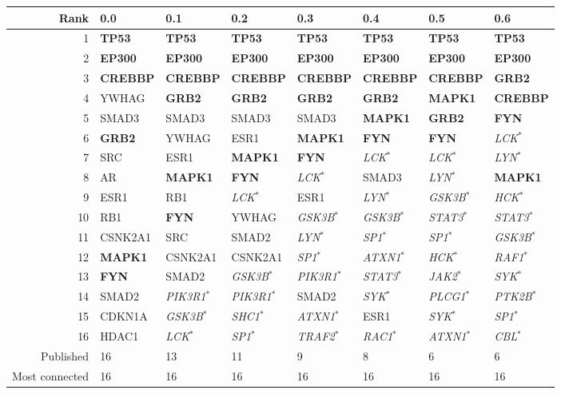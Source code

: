 \begin{tabular}{r*{7}{l}}
\toprule
Rank & 0.0 & 0.1 & 0.2 & 0.3 & 0.4 & 0.5 & 0.6 \\
\midrule
1 & \textbf{TP53} & \textbf{TP53} & \textbf{TP53} & \textbf{TP53} & \textbf{TP53} & \textbf{TP53} & \textbf{TP53} \\
2 & \textbf{EP300} & \textbf{EP300} & \textbf{EP300} & \textbf{EP300} & \textbf{EP300} & \textbf{EP300} & \textbf{EP300} \\
3 & \textbf{CREBBP} & \textbf{CREBBP} & \textbf{CREBBP} & \textbf{CREBBP} & \textbf{CREBBP} & \textbf{CREBBP} & \textbf{GRB2} \\
4 & YWHAG & \textbf{GRB2} & \textbf{GRB2} & \textbf{GRB2} & \textbf{GRB2} & \textbf{MAPK1} & \textbf{CREBBP} \\
5 & SMAD3 & SMAD3 & SMAD3 & SMAD3 & \textbf{MAPK1} & \textbf{GRB2} & \textbf{FYN} \\
6 & \textbf{GRB2} & YWHAG & ESR1 & \textbf{MAPK1} & \textbf{FYN} & \textbf{FYN} & \textit{LCK}$^{\ast}$ \\
7 & SRC & ESR1 & \textbf{MAPK1} & \textbf{FYN} & \textit{LCK}$^{\ast}$ & \textit{LCK}$^{\ast}$ & \textit{LYN}$^{\ast}$ \\
8 & AR & \textbf{MAPK1} & \textbf{FYN} & \textit{LCK}$^{\ast}$ & SMAD3 & \textit{LYN}$^{\ast}$ & \textbf{MAPK1} \\
9 & ESR1 & RB1 & \textit{LCK}$^{\ast}$ & ESR1 & \textit{LYN}$^{\ast}$ & \textit{GSK3B}$^{\ast}$ & \textit{HCK}$^{\ast}$ \\
10 & RB1 & \textbf{FYN} & YWHAG & \textit{GSK3B}$^{\ast}$ & \textit{GSK3B}$^{\ast}$ & \textit{STAT3}$^{\ast}$ & \textit{STAT3}$^{\ast}$ \\
11 & CSNK2A1 & SRC & SMAD2 & \textit{LYN}$^{\ast}$ & \textit{SP1}$^{\ast}$ & \textit{SP1}$^{\ast}$ & \textit{GSK3B}$^{\ast}$ \\
12 & \textbf{MAPK1} & CSNK2A1 & CSNK2A1 & \textit{SP1}$^{\ast}$ & \textit{ATXN1}$^{\ast}$ & \textit{HCK}$^{\ast}$ & \textit{RAF1}$^{\ast}$ \\
13 & \textbf{FYN} & SMAD2 & \textit{GSK3B}$^{\ast}$ & \textit{PIK3R1}$^{\ast}$ & \textit{STAT3}$^{\ast}$ & \textit{JAK2}$^{\ast}$ & \textit{SYK}$^{\ast}$ \\
14 & SMAD2 & \textit{PIK3R1}$^{\ast}$ & \textit{PIK3R1}$^{\ast}$ & SMAD2 & \textit{SYK}$^{\ast}$ & \textit{PLCG1}$^{\ast}$ & \textit{PTK2B}$^{\ast}$ \\
15 & CDKN1A & \textit{GSK3B}$^{\ast}$ & \textit{SHC1}$^{\ast}$ & \textit{ATXN1}$^{\ast}$ & ESR1 & \textit{SYK}$^{\ast}$ & \textit{SP1}$^{\ast}$ \\
16 & HDAC1 & \textit{LCK}$^{\ast}$ & \textit{SP1}$^{\ast}$ & \textit{TRAF2}$^{\ast}$ & \textit{RAC1}$^{\ast}$ & \textit{ATXN1}$^{\ast}$ & \textit{CBL}$^{\ast}$ \\
\midrule
Published & 16 & 13 & 11 & 9 & 8 & 6 & 6 \\
Most connected & 16 & 16 & 16 & 16 & 16 & 16 & 16 \\
\bottomrule
\end{tabular}
